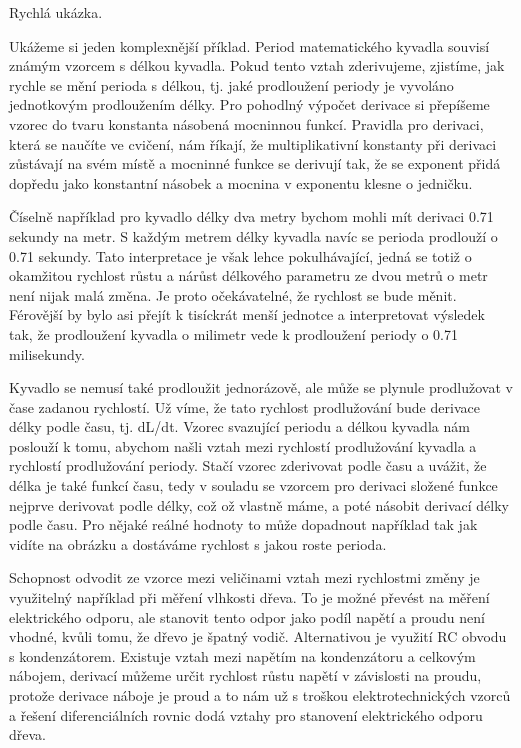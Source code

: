 \documentclass[12pt]{article}
\begin{document}
Rychlá ukázka.

Ukážeme si jeden komplexnější příklad. Period matematického kyvadla souvisí známým vzorcem s délkou kyvadla. Pokud tento vztah zderivujeme, zjistíme, jak rychle se mění perioda s délkou, tj. jaké prodloužení periody je vyvoláno jednotkovým prodloužením délky. Pro pohodlný výpočet derivace si přepíšeme vzorec do tvaru konstanta násobená mocninnou funkcí. Pravidla pro derivaci, která se naučíte ve cvičení, nám říkají, že multiplikativní konstanty při derivaci zůstávají na svém místě a mocninné funkce se derivují tak, že se exponent přidá dopředu jako konstantní násobek a mocnina v exponentu klesne o jedničku.

Číselně například pro kyvadlo délky dva metry bychom mohli mít derivaci 0.71 sekundy na metr. S každým metrem délky kyvadla navíc se perioda prodlouží o 0.71 sekundy. Tato interpretace je však lehce pokulhávající, jedná se totiž o okamžitou rychlost růstu a nárůst délkového parametru ze dvou metrů o metr není nijak malá změna. Je proto očekávatelné, že rychlost se bude měnit. Férovější by bylo asi přejít k tisíckrát menší jednotce a interpretovat výsledek tak, že prodloužení kyvadla o milimetr vede k prodloužení periody o 0.71 milisekundy.

Kyvadlo se nemusí také prodloužit jednorázově, ale může se plynule prodlužovat v čase zadanou rychlostí. Už víme, že tato rychlost prodlužování bude derivace délky podle času, tj. dL/dt. Vzorec svazující periodu a délkou kyvadla nám poslouží k tomu, abychom našli vztah mezi rychlostí prodlužování kyvadla a rychlostí prodlužování periody. Stačí vzorec zderivovat podle času a uvážit, že délka je také funkcí času, tedy v souladu se vzorcem pro derivaci složené funkce nejprve derivovat podle délky, což ož vlastně máme, a poté násobit derivací délky podle času. Pro nějaké reálné hodnoty to může dopadnout například tak jak vidíte na obrázku a dostáváme rychlost s jakou roste perioda.

Schopnost odvodit ze vzorce mezi veličinami vztah mezi rychlostmi změny je využitelný například při měření vlhkosti dřeva. To je možné převést na měření elektrického odporu, ale stanovit tento odpor jako podíl napětí a proudu není vhodné, kvůli tomu, že dřevo je špatný vodič. Alternativou je využití RC obvodu s kondenzátorem. Existuje vztah mezi napětím na kondenzátoru a celkovým nábojem, derivací můžeme určit rychlost růstu napětí v závislosti na proudu, protože derivace náboje je proud a to nám už s troškou elektrotechnických vzorců a řešení diferenciálních rovnic dodá vztahy pro stanovení elektrického odporu dřeva.
\end{document}
